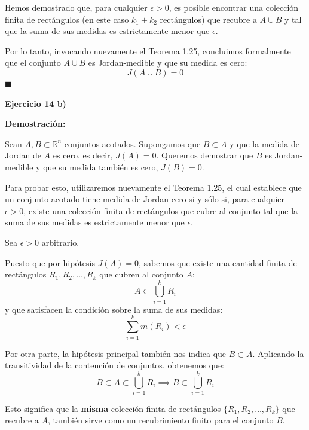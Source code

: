 \documentclass[11pt,letterpaper]{article}
\begin{document}
Hemos demostrado que, para cualquier $\epsilon > 0$, es posible encontrar una colección finita de rectángulos (en este caso $k_1 + k_2$ rectángulos) que recubre a $A \cup B$ y tal que la suma de sus medidas es estrictamente menor que $\epsilon$. 

Por lo tanto, invocando nuevamente el Teorema 1.25, concluimos formalmente que el conjunto $A \cup B$ es Jordan-medible y que su medida es cero:
\begin{equation*}
J(A \cup B) = 0
\end{equation*}
\hfill $\blacksquare$

\textbf{Ejercicio 14 b)}

\textbf{Demostración:}

Sean $A, B \subset \mathbb{R}^n$ conjuntos acotados. Supongamos que $B \subset A$ y que la medida de Jordan de $A$ es cero, es decir, $J(A) = 0$. Queremos demostrar que $B$ es Jordan-medible y que su medida también es cero, $J(B) = 0$.

Para probar esto, utilizaremos nuevamente el Teorema 1.25, el cual establece que un conjunto acotado tiene medida de Jordan cero si y sólo si, para cualquier $\epsilon > 0$, existe una colección finita de rectángulos que cubre al conjunto tal que la suma de sus medidas es estrictamente menor que $\epsilon$.

Sea $\epsilon > 0$ arbitrario.

Puesto que por hipótesis $J(A) = 0$, sabemos que existe una cantidad finita de rectángulos $R_1, R_2, \dots, R_k$ que cubren al conjunto $A$:
\begin{equation*}
A \subset \bigcup_{i=1}^{k} R_i
\end{equation*}
y que satisfacen la condición sobre la suma de sus medidas:
\begin{equation*}
\sum_{i=1}^{k} m(R_i) < \epsilon
\end{equation*}

Por otra parte, la hipótesis principal también nos indica que $B \subset A$. Aplicando la transitividad de la contención de conjuntos, obtenemos que:
\begin{equation*}
B \subset A \subset \bigcup_{i=1}^{k} R_i \implies B \subset \bigcup_{i=1}^{k} R_i
\end{equation*}

Esto significa que la \textbf{misma} colección finita de rectángulos $\{R_1, R_2, \dots, R_k\}$ que recubre a $A$, también sirve como un recubrimiento finito para el conjunto $B$. 
\end{document}
